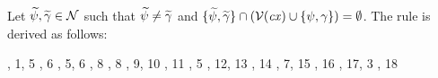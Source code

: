 Let $\widetilde{\psi},\widetilde{\gamma}\in\mathcal{N}$ such that $\widetilde{\psi}\neq\widetilde{\gamma}$ and
$\{\widetilde{\psi},\widetilde{\gamma}\}\cap(\mathcal{V}(\mathit{cx})\cup\{\psi,\gamma\})=
\emptyset$. The rule is derived as follows:
\begin{derivation}
\step{\istyO{\typ}}{\hyp}
\step{\isty{\snoc{\cx}{\vdec{\varFXpred}{\tarr{\typ}{\bool}}}}{\typ}}
     {, 1, 5}
\step{\hasty{\snoc{\cx}{\vdec{\varFXpred}{\tarr{\typ}{\bool}}}}
            {\faopO}{\tarr{(\tarr{\typ}{\bool})}{\bool}}}
     {\Refaop, 6}
\step{\cxwf{\snoc{\snoc{\cx}
             {\vdec{\varFXpred}{\tarr{\typ}{\bool}}}}{\vdec{\varFX}{\typ}}}}
     {\Rcxvdec, 5, 6}
\step{\hasty{\snoc{\snoc{\cx}
              {\vdec{\varFXpred}{\tarr{\typ}{\bool}}}}{\vdec{\varFX}{\typ}}}
            {\varFXpred}{\tarr{\typ}{\bool}}}
     {\Revar, 8}
\step{\hasty{\snoc{\snoc{\cx}
              {\vdec{\varFXpred}{\tarr{\typ}{\bool}}}}{\vdec{\varFX}{\typ}}}
            {\varFX}{\typ}}
     {\Revar, 8}
\step{\hasty{\snoc{\snoc{\cx}
              {\vdec{\varFXpred}{\tarr{\typ}{\bool}}}}{\vdec{\varFX}{\typ}}}
            {\app{\varFXpred}{\varFX}}{\bool}}
     {\Reapp, 9, 10}
\step{\hasty{\snoc{\snoc{\cx}
              {\vdec{\varFXpred}{\tarr{\typ}{\bool}}}}{\vdec{\varFX}{\typ}}}
            {\nega{(\app{\varFXpred}{\varFX})}}{\bool}}
     {\Renega, 11}
\step{\isty{\snoc{\cx}{\vdec{\varFXpred}{\tarr{\typ}{\bool}}}}{\bool}}
     {\Rtbool, 5}
\step{\hasty{\snoc{\cx}{\vdec{\varFXpred}{\tarr{\typ}{\bool}}}}
            {\abs{\varFX}{\typ}{\nega{(\app{\varFXpred}{\varFX})}}}
            {\tarr{\typ}{\bool}}}
     {\Reabs, 12, 13}
\step{\hasty{\snoc{\cx}{\vdec{\varFXpred}{\tarr{\typ}{\bool}}}}
            {\abs{\varfx}{\typ}{\nega{(\app{\varFXpred}{\varfx})}}}
            {\tarr{\typ}{\bool}}}
     {\Reabsalpha, 14}
\step{\hasty{\snoc{\cx}{\vdec{\varFXpred}{\tarr{\typ}{\bool}}}}
            {\fa{\varfx}{\typ}{\nega{(\app{\varFXpred}{\varfx})}}}
            {\bool}}
     {\Reapp, 7, 15}
\step{\hasty{\snoc{\cx}{\vdec{\varFXpred}{\tarr{\typ}{\bool}}}}
            {\nega{(\fa{\varfx}{\typ}{\nega{(\app{\varFXpred}{\varfx})}})}}
            {\bool}}
     {\Renega, 16}
\step{\hastyO{\abs{\varFXpred}{\tarr{\typ}{\bool}}
                  {\nega{(\fa{\varfx}{\typ}
                             {\nega{(\app{\varFXpred}{\varfx})}})}}}
             {\tarr{(\tarr{\typ}{\bool})}{\bool}}}
     {\Reabs, 17, 3}
\step{\hastyO{\abs{\varfxpred}{\tarr{\typ}{\bool}}
                  {\nega{(\fa{\varfx}{\typ}
                             {\nega{(\app{\varfxpred}{\varfx})}})}}}
             {\tarr{(\tarr{\typ}{\bool})}{\bool}}}
     {\Reabsalpha, 18}
\end{derivation}



